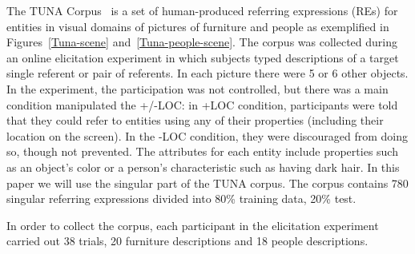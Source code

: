\label{tunaDescription}The TUNA Corpus~\cite{gatt-balz-kow:2008:ENLG} is a set of human-produced referring expressions (REs) for entities in visual domains of pictures of furniture and people as exemplified in Figures~\ref{Tuna-scene} and~\ref{Tuna-people-scene}. The corpus was
collected during an online elicitation experiment in which subjects typed descriptions of a target single referent or pair of referents. 
In each picture there were 5 or 6 other objects. 
In the experiment, the participation was not controlled, but there was a main condition manipulated the +/-LOC: in +LOC condition, participants were told that they could refer to entities using any of their properties (including their location on the screen). In the -LOC condition, they were discouraged from doing so, though not prevented. 
The attributes for each entity include properties such as an object's color or a person's characteristic such as having dark hair.
In this paper we will use the singular part of the TUNA corpus. The corpus contains 780 singular referring expressions divided
into 80\% training data, 20\% test. 

In order to collect the corpus, each participant in the elicitation experiment carried out 38 trials, 20 furniture descriptions and 18 people descriptions.  


